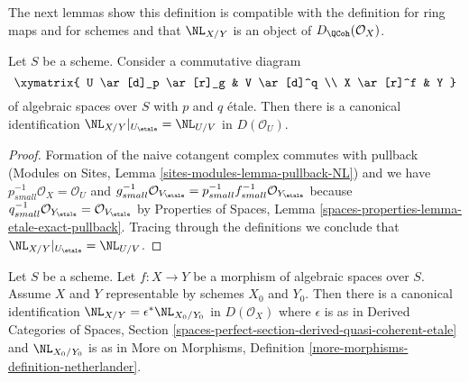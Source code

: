 \noindent
The next lemmas show this definition is compatible with the definition
for ring maps and for schemes and that $\NL_{X/Y}$ is an
object of $D_\QCoh(\mathcal{O}_X)$.

\begin{lemma}
\label{lemma-NL-etale-localization}
Let $S$ be a scheme. Consider a commutative diagram
$$
\xymatrix{
U \ar[d]_p \ar[r]_g & V \ar[d]^q \\
X \ar[r]^f & Y
}
$$
of algebraic spaces over $S$ with $p$ and $q$ \'etale.
Then there is a canonical identification
$\NL_{X/Y}|_{U_\etale} = \NL_{U/V}$ in $D(\mathcal{O}_U)$.
\end{lemma}

\begin{proof}
Formation of the naive cotangent complex commutes with pullback
(Modules on Sites, Lemma \ref{sites-modules-lemma-pullback-NL})
and we have $p_{small}^{-1}\mathcal{O}_X = \mathcal{O}_U$ and
$g_{small}^{-1}\mathcal{O}_{V_\etale} =
p_{small}^{-1}f_{small}^{-1}\mathcal{O}_{Y_\etale}$
because $q_{small}^{-1}\mathcal{O}_{Y_\etale} =
\mathcal{O}_{V_\etale}$ by Properties of Spaces, Lemma
\ref{spaces-properties-lemma-etale-exact-pullback}.
Tracing through the definitions we conclude that
$\NL_{X/Y}|_{U_\etale} = \NL_{U/V}$.
\end{proof}

\begin{lemma}
\label{lemma-NL-compare-spaces-schemes}
Let $S$ be a scheme. Let $f : X \to Y$ be a morphism of algebraic spaces
over $S$. Assume $X$ and $Y$ representable by schemes $X_0$ and $Y_0$.
Then there is a canonical identification
$\NL_{X/Y} = \epsilon^*\NL_{X_0/Y_0}$ in $D(\mathcal{O}_X)$
where $\epsilon$ is as in Derived Categories of Spaces, Section
\ref{spaces-perfect-section-derived-quasi-coherent-etale}
and $\NL_{X_0/Y_0}$ is as in
More on Morphisms, Definition
\ref{more-morphisms-definition-netherlander}.
\end{lemma}

